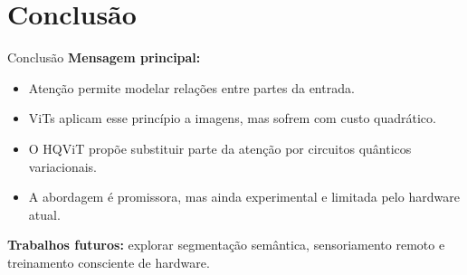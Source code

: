 \section{Conclusão}

\begin{frame}{Conclusão}
    \textbf{Mensagem principal:}
    \begin{itemize}
        \item Atenção permite modelar relações entre partes da entrada.
        \item ViTs aplicam esse princípio a imagens, mas sofrem com custo quadrático.
        \item O HQViT propõe substituir parte da atenção por circuitos quânticos variacionais.
        \item A abordagem é promissora, mas ainda experimental e limitada pelo hardware atual.
    \end{itemize}
    \vspace{0.4em}
    \textbf{Trabalhos futuros:} explorar segmentação semântica, sensoriamento remoto e treinamento consciente de hardware.
\end{frame}
